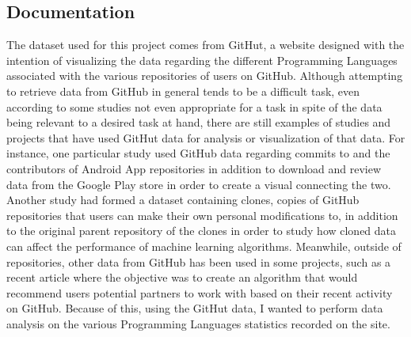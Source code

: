 \documentclass{article}
\theoremstyle{theorem}
\theoremstyle{definition}
\theoremstyle{remark}
\begin{document}
\subsection{Documentation}
The dataset used for this project comes from \cite{GT} GitHut, a website designed with the intention of visualizing the data regarding the different Programming Languages associated with the various repositories of users on \cite{GH} GitHub. Although attempting to retrieve data from GitHub in general tends to be a difficult task, even according to some studies \cite{MS} not even appropriate for a task in spite of the data being relevant to a desired task at hand, there are still examples of studies and projects that have used GitHut data for analysis or visualization of that data. For instance, one particular study \cite{AA} used GitHub data regarding commits to and the contributors of Android App repositories in addition to download and review data from the Google Play store in order to create a visual connecting the two. Another study \cite{GD} had formed a dataset containing clones, copies of GitHub repositories that users can make their own personal modifications to, in addition to the original parent repository of the clones in order to study how cloned data can affect the performance of machine learning algorithms. Meanwhile, outside of repositories, other data from GitHub has been used in some projects, such as a recent article \cite{PP} where the objective was to create an algorithm that would recommend users potential partners to work with based on their recent activity on GitHub. Because of this, using the \cite{GT} GitHut data, I wanted to perform data analysis on the various Programming Languages statistics recorded on the site.
\\
\\
\end{document}
